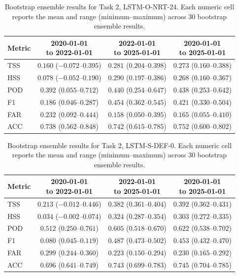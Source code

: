 \begin{table}[htbp]
\centering
\small
\caption{Bootstrap ensemble results for Task 2, LSTM-O-NRT-24. Each numeric cell reports the mean and range (minimum--maximum) across 30 bootstrap ensemble results.}
\label{tab:app-task2-lstm-o-nrt-24}
\begin{tabular}{lccc}
\toprule
Metric & \shortstack{2020-01-01\\to 2022-01-01} & \shortstack{2022-01-01\\to 2025-01-01} & \shortstack{2020-01-01\\to 2025-01-01} \\
\midrule
TSS & $0.160$ ($-0.072$--$0.395$) & $0.281$ ($0.204$--$0.398$) & $0.273$ ($0.160$--$0.388$) \\
HSS & $0.078$ ($-0.052$--$0.190$) & $0.290$ ($0.197$--$0.386$) & $0.268$ ($0.160$--$0.367$) \\
POD & $0.392$ ($0.055$--$0.712$) & $0.440$ ($0.254$--$0.647$) & $0.438$ ($0.253$--$0.642$) \\
F1 & $0.186$ ($0.046$--$0.287$) & $0.454$ ($0.362$--$0.545$) & $0.421$ ($0.330$--$0.504$) \\
FAR & $0.232$ ($0.092$--$0.444$) & $0.158$ ($0.050$--$0.395$) & $0.165$ ($0.055$--$0.410$) \\
ACC & $0.738$ ($0.562$--$0.848$) & $0.742$ ($0.615$--$0.785$) & $0.752$ ($0.600$--$0.802$) \\
\bottomrule
\end{tabular}
\end{table}
\clearpage

\begin{table}[htbp]
\centering
\small
\caption{Bootstrap ensemble results for Task 2, LSTM-S-DEF-0. Each numeric cell reports the mean and range (minimum--maximum) across 30 bootstrap ensemble results.}
\label{tab:app-task2-lstm-s-def-0}
\begin{tabular}{lccc}
\toprule
Metric & \shortstack{2020-01-01\\to 2022-01-01} & \shortstack{2022-01-01\\to 2025-01-01} & \shortstack{2020-01-01\\to 2025-01-01} \\
\midrule
TSS & $0.213$ ($-0.012$--$0.446$) & $0.382$ ($0.361$--$0.404$) & $0.392$ ($0.362$--$0.431$) \\
HSS & $0.034$ ($-0.002$--$0.074$) & $0.324$ ($0.287$--$0.354$) & $0.303$ ($0.272$--$0.335$) \\
POD & $0.512$ ($0.250$--$0.761$) & $0.605$ ($0.518$--$0.670$) & $0.622$ ($0.538$--$0.702$) \\
F1 & $0.080$ ($0.045$--$0.119$) & $0.487$ ($0.473$--$0.502$) & $0.453$ ($0.432$--$0.470$) \\
FAR & $0.299$ ($0.244$--$0.360$) & $0.223$ ($0.150$--$0.294$) & $0.230$ ($0.165$--$0.292$) \\
ACC & $0.696$ ($0.641$--$0.749$) & $0.743$ ($0.699$--$0.783$) & $0.745$ ($0.704$--$0.785$) \\
\bottomrule
\end{tabular}
\end{table}
\clearpage

